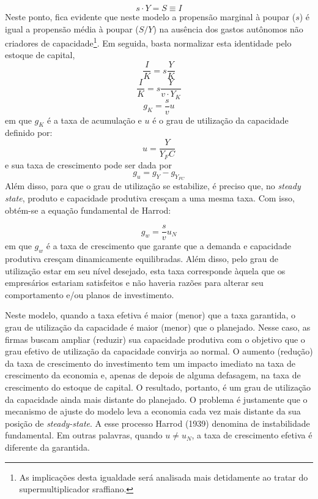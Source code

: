 $$
s\cdot Y = S \equiv I
$$
Neste ponto, fica evidente que neste modelo a propensão marginal à poupar ($s$) é igual a propensão média à poupar ($S/Y$) na ausência dos gastos autônomos não criadores de capacidade\footnote{As implicações desta igualdade será analisada mais detidamente ao tratar do supermultiplicador sraffiano.}. Em seguida, basta normalizar esta identidade pelo estoque de capital,
$$
\frac{I}{K} = s\frac{Y}{K}
$$
$$
\frac{I}{K} = s\frac{Y}{v\cdot Y_K}
$$
\begin{equation}
    g_K = \frac{s}{v}u
\end{equation}
em que $g_K$ é a taxa de acumulação e $u$ é o grau de utilização da capacidade definido por:
$$
u = \frac{Y}{Y_FC}
$$
e sua taxa de crescimento pode ser dada por
$$
g_u = g_Y - g_{Y_{FC}}
$$
Além disso, para que o grau de utilização se estabilize, é preciso que, no \textit{steady state}, produto e capacidade produtiva cresçam a uma mesma taxa. Com isso, obtém-se a equação fundamental de Harrod:

\begin{equation}
    \label{Fundamental}
    g_w = \frac{s}{v}u_N
\end{equation}
em que $g_w$ é a taxa de crescimento que garante que a demanda e capacidade produtiva cresçam dinamicamente equilibradas. Além disso, pelo grau de utilização estar em seu nível desejado, esta taxa corresponde àquela que os empresários estariam satisfeitos e não haveria razões para alterar seu comportamento e/ou planos de investimento. 

Neste modelo, quando a taxa efetiva é maior (menor) que a taxa garantida, o grau de utilização da capacidade é maior (menor) que o planejado. Nesse caso, as firmas buscam ampliar (reduzir) sua capacidade produtiva com o objetivo que o grau efetivo de utilização da capacidade convirja ao normal. O aumento (redução) da taxa de crescimento do investimento tem um impacto imediato na taxa de crescimento da
economia e, apenas de depois de alguma defasagem, na taxa de crescimento do estoque de capital. O resultado, portanto, é um grau de utilização da capacidade ainda mais distante do planejado. O problema é justamente que o mecanismo de ajuste do modelo leva a economia cada vez mais distante da sua posição de \textit{steady-state}. A esse processo Harrod (1939) denomina de instabilidade fundamental. Em outras palavras, quando $u\neq u_N$,  a taxa de crescimento efetiva é diferente da garantida.




